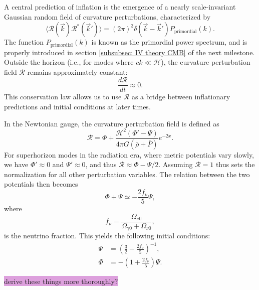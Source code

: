 \documentclass{aa}
\numberwithin{equation}{section}
\numberwithin{table}{section}
\numberwithin{figure}{section}
\begin{document}
A central prediction of inflation is the emergence of a nearly scale-invariant Gaussian random field of curvature perturbations, characterized by
\begin{equation}
  \langle\mathcal{R}(\vec{k})\mathcal{R}^*(\vec{k}')\rangle = (2\pi)^3\delta(\vec{k}-\vec{k}')P_\text{primordial}(k).
\end{equation}
The function $P_\text{primordial}(k)$ is known as the primordial power spectrum, and is properly introduced in section \ref{subsubsec: IV theory CMB} of the next milestone. Outside the horizon (i.e., for modes where $ck \ll \mathcal{H}$), the curvature perturbation field $\mathcal{R}$ remains approximately constant:
\begin{equation}
\frac{d\mathcal{R}}{dt} \approx 0.
\end{equation}
This conservation law allows us to use $\mathcal{R}$ as a bridge between inflationary predictions and initial conditions at later times. 

In the Newtonian gauge, the curvature perturbation field is defined as
\begin{equation}
\mathcal{R} = \Phi + \frac{\mathcal{H}^2\left( \Phi' - \Psi \right)}{4\pi G (\bar{\rho} + \bar{P})}e^{-2x}.
\end{equation}
For superhorizon modes in the radiation era, where metric potentials vary slowly, we have $\Phi' \approx 0$ and $\Psi' \approx 0$, and thus $\mathcal{R} \approx \Phi - \Psi/2$. Assuming $\mathcal{R} = 1$ thus sets the normalization for all other perturbation variables. The relation between the two potentials then becomes
\begin{equation}
\Phi + \Psi \simeq -\frac{2f_\nu}{5} \Psi,
\end{equation}
where 
\begin{equation}
  f_\nu = \frac{\Omega_{\nu 0}}{\Omega_{\gamma 0} + \Omega_{\nu 0}}, 
\end{equation}
is the neutrino fraction. This yields the following initial conditions:
\begin{align}
\Psi &= \left(\frac{3}{2} + \frac{2f_\nu}{5}\right)^{-1}, \\
\Phi &= -\left(1 + \frac{2f_\nu}{5} \right)\Psi.
\end{align}

\colorbox{Plum}{derive these things more thoroughly?}
\end{document}

